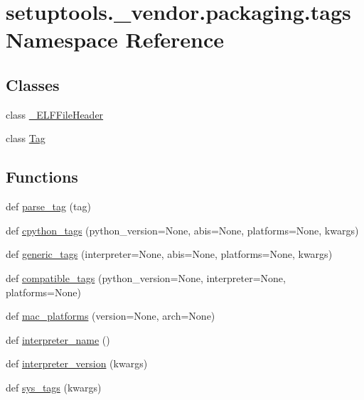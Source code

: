 \hypertarget{namespacesetuptools_1_1__vendor_1_1packaging_1_1tags}{}\section{setuptools.\+\_\+vendor.\+packaging.\+tags Namespace Reference}
\label{namespacesetuptools_1_1__vendor_1_1packaging_1_1tags}
\subsection*{Classes}
\begin{DoxyCompactItemize}
\item 
class \hyperlink{classsetuptools_1_1__vendor_1_1packaging_1_1tags_1_1__ELFFileHeader}{\+\_\+\+E\+L\+F\+File\+Header}
\item 
class \hyperlink{classsetuptools_1_1__vendor_1_1packaging_1_1tags_1_1Tag}{Tag}
\end{DoxyCompactItemize}
\subsection*{Functions}
\begin{DoxyCompactItemize}
\item 
def \hyperlink{namespacesetuptools_1_1__vendor_1_1packaging_1_1tags_a16a40a874f5261641cd9bd5331cb7034}{parse\+\_\+tag} (tag)
\item 
def \hyperlink{namespacesetuptools_1_1__vendor_1_1packaging_1_1tags_ab5791389704aaa4bea021d3e094bb8a7}{cpython\+\_\+tags} (python\+\_\+version=None, abis=None, platforms=None, kwargs)
\item 
def \hyperlink{namespacesetuptools_1_1__vendor_1_1packaging_1_1tags_a5bdf286a77df0f298ed224fb44c32487}{generic\+\_\+tags} (interpreter=None, abis=None, platforms=None, kwargs)
\item 
def \hyperlink{namespacesetuptools_1_1__vendor_1_1packaging_1_1tags_a798b9826e4d2530785433a33c87f3256}{compatible\+\_\+tags} (python\+\_\+version=None, interpreter=None, platforms=None)
\item 
def \hyperlink{namespacesetuptools_1_1__vendor_1_1packaging_1_1tags_a5f521f37fd1b85e8df64b489152a62e4}{mac\+\_\+platforms} (version=None, arch=None)
\item 
def \hyperlink{namespacesetuptools_1_1__vendor_1_1packaging_1_1tags_ace3aebeb4d284b3ceccc848edfdfdeb5}{interpreter\+\_\+name} ()
\item 
def \hyperlink{namespacesetuptools_1_1__vendor_1_1packaging_1_1tags_aef68f7c5a1182234b81fa9d4f5c48c35}{interpreter\+\_\+version} (kwargs)
\item 
def \hyperlink{namespacesetuptools_1_1__vendor_1_1packaging_1_1tags_a8d3007b31844a97ebb1009bd78674f13}{sys\+\_\+tags} (kwargs)
\end{DoxyCompactItemize}
